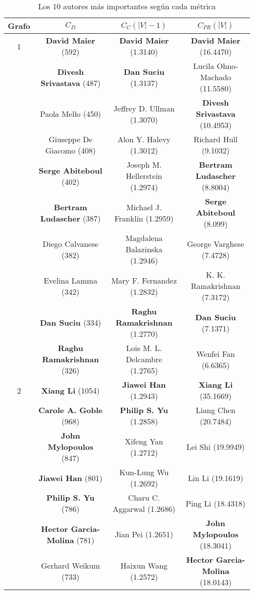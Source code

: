 \documentclass[journal]{IEEEtran}
\let\MYoriglatexcaption\caption
\renewcommand{\caption}[2][\relax]{\MYoriglatexcaption[#2]{#2}}
\begin{document}
\begin{table*}
	\renewcommand{\arraystretch}{1.3}
	\caption{Los 10 autores más importantes según cada métrica}
	\label{tab:erdos}
	\centering
	\begin{tabular}{c|c|c|c}
		\hline
		Grafo & \(C_D\) & \(C_C (|V| - 1)\) & \(C_{PR} (|V|)\)\\
		\hline\hline
		1 & \textbf{David Maier} (592)& \textbf{David Maier} (1.3140)& \textbf{David Maier} (16.4470)\\
		  &	\textbf{Divesh Srivastava} (487)& \textbf{Dan Suciu} (1.3137)& Lucila Ohno-Machado (11.5580)\\
		  &	Paola Mello (450)& Jeffrey D. Ullman (1.3070)& \textbf{Divesh Srivastava} (10.4953)\\
		  &	Giuseppe De Giacomo (408)& Alon Y. Halevy (1.3012)& Richard Hull (9.1032)\\
		  &	\textbf{Serge Abiteboul} (402)& Joseph M. Hellerstein (1.2974)& \textbf{Bertram Ludascher} (8.8004)\\
		  & \textbf{Bertram Ludascher} (387)& Michael J. Franklin (1.2959)& \textbf{Serge Abiteboul} (8.099)\\
		  & Diego Calvanese (382)& Magdalena Balazinska (1.2946)& George Varghese (7.4728)\\
		  & Evelina Lamma (342)& Mary F. Fernandez (1.2832)& K. K. Ramakrishnan (7.3172)\\
		  & \textbf{Dan Suciu} (334)& \textbf{Raghu Ramakrishnan} (1.2770)& \textbf{Dan Suciu} (7.1371)\\
		  &	\textbf{Raghu Ramakrishnan} (326)& Lois M. L. Delcambre (1.2765)& Wenfei Fan (6.6365)\\
		\hline
		2 & \textbf{Xiang Li} (1054)& \textbf{Jiawei Han} (1.2943)& \textbf{Xiang Li} (35.1669)\\
		  &	\textbf{Carole A. Goble} (968)& \textbf{Philip S. Yu} (1.2858)& Liang Chen (20.7484)\\
		  & \textbf{John Mylopoulos} (847)& Xifeng Yan (1.2712)& Lei Shi (19.9949)\\
		  & \textbf{Jiawei Han} (801)& Kun-Lung Wu (1.2692)& Lin Li (19.1619)\\
		  &	\textbf{Philip S. Yu} (786)& Charu C. Aggarwal (1.2686)& Ping Li (18.4318)\\
		  & \textbf{Hector Garcia-Molina} (781)& Jian Pei (1.2651)& \textbf{John Mylopoulos} (18.3041)\\
		  & Gerhard Weikum (733)& Haixun Wang (1.2572)& \textbf{Hector Garcia-Molina} (18.0143)\\

\end{tabular}
\end{table*}
\end{document}
